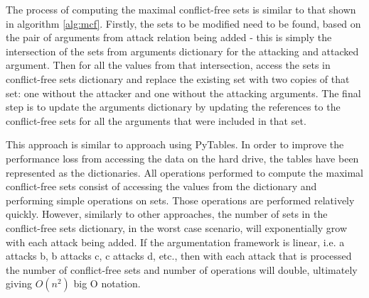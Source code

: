 
The process of computing the maximal conflict-free sets is similar to that shown in algorithm \ref{alg:mcf}. Firstly, the sets to be modified need to be found, based on the pair of arguments from attack relation being added - this is simply the intersection of the sets from arguments dictionary for the attacking and attacked argument. Then for all the values from that intersection, access the sets in conflict-free sets dictionary and replace the existing set with two copies of that set: one without the attacker and one without the attacking arguments. The final step is to update the arguments dictionary by updating the references to the conflict-free sets for all the arguments that were included in that set.

This approach is similar to approach using PyTables. In order to improve the performance loss from accessing the data on the hard drive, the tables have been represented as the dictionaries. All operations performed to compute the maximal conflict-free sets consist of accessing the values from the dictionary and performing simple operations on sets. Those operations are performed relatively quickly. However, similarly to other approaches, the number of sets in the conflict-free sets dictionary, in the worst case scenario, will exponentially grow with each attack being added. If the argumentation framework is linear, i.e. a attacks b, b attacks c, c attacks d, etc., then with each attack that is processed the number of conflict-free sets and number of operations will double, ultimately giving $O(n^2)$ big O notation. 



